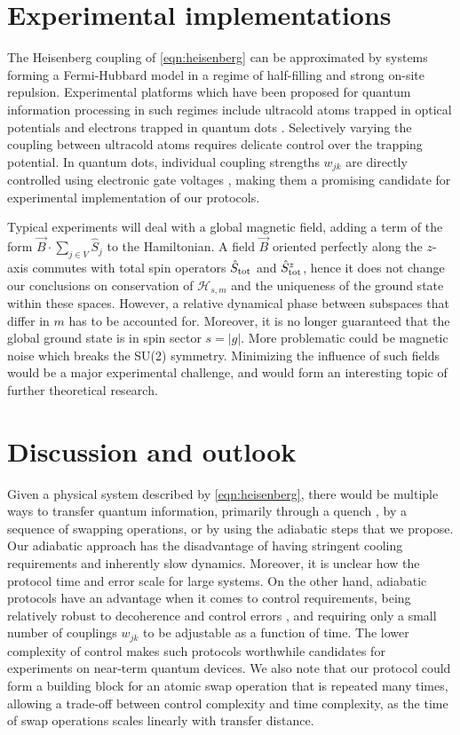 \section{Experimental implementations}
\label{sec:implementations}

The Heisenberg coupling of \cref{eqn:heisenberg} can be approximated by systems forming a Fermi-Hubbard model in a regime of half-filling and strong on-site repulsion. Experimental platforms which have been proposed for quantum information processing in such regimes include ultracold atoms trapped in optical potentials \cite{Murmann2015,Mazurenko2017} and electrons trapped in quantum dots \cite{Loss1998,Hanson2007}. Selectively varying the coupling between ultracold atoms requires delicate control over the trapping potential. In quantum dots, individual coupling strengths $w_{jk}$ are directly controlled using electronic gate voltages \cite{Hensgens2017}, making them a promising candidate for experimental implementation of our protocols. 

Typical experiments will deal with a global magnetic field, adding a term of the form $\vec{B} \cdot \sum_{j \in V} \hat{S}_j$ to the Hamiltonian. A field $\vec{B}$ oriented perfectly along the $z$-axis commutes with total spin operators ${\hat{S}_\text{tot}}$ and ${\hat{S}_\text{tot}}^z$, hence it does not change our conclusions on conservation of $\mathcal{H}_{s,m}$ and the uniqueness of the ground state within these spaces. However, a relative dynamical phase between subspaces that differ in $m$ has to be accounted for. Moreover, it is no longer guaranteed that the global ground state is in spin sector $s=|g|$. More problematic could be magnetic noise which breaks the SU(2) symmetry. Minimizing the influence of such fields would be a major experimental challenge, and would form an interesting topic of further theoretical research. 


\section{Discussion and outlook}
\label{sec:discussion}
Given a physical system described by \cref{eqn:heisenberg}, there would be multiple ways to transfer quantum information, primarily through a quench \cite{Bose2007}, by a sequence of swapping operations, or by using the adiabatic steps that we propose. Our adiabatic approach has the disadvantage of having stringent cooling requirements and inherently slow dynamics. Moreover, it is unclear how the protocol time and error scale for large systems. On the other hand, adiabatic protocols have an advantage when it comes to control requirements, being relatively robust to decoherence and control errors \cite{Farooq2015,Childs2001}, and requiring only a small number of couplings $w_{jk}$ to be adjustable as a function of time. The lower complexity of control makes such protocols worthwhile candidates for experiments on near-term quantum devices. We also note that our protocol could form a building block for an atomic swap operation that is repeated many times, allowing a trade-off between control complexity and time complexity, as the time of swap operations scales linearly with transfer distance. 

